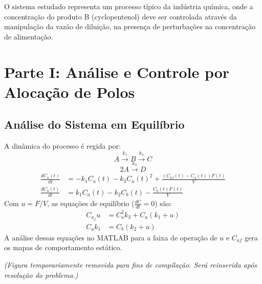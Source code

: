 \documentclass[a4paper,12pt]{report}
\begin{document}
O sistema estudado representa um processo típico da indústria química, onde a concentração do produto B (cyclopentenol) deve ser controlada através da manipulação da vazão de diluição, na presença de perturbações na concentração de alimentação.

\chapter{Parte I: Análise e Controle por Alocação de Polos}
\section{Análise do Sistema em Equilíbrio}
A dinâmica do processo é regida por:
\[ A \xrightarrow{k_1} B \xrightarrow{k_2} C \]
\[ 2A \xrightarrow{k_3} D\]
\begin{align}
\frac{dC_a(t)}{dt} &= -k_1 C_a(t) - k_3 C_a(t)^2 + \frac{(C_{af}(t) - C_a(t)) F(t)}{V} \\
\frac{dC_b(t)}{dt} &= k_1 C_a(t) - k_2 C_b(t) - \frac{C_b(t) F(t)}{V}
\end{align}
Com \(u = F/V\), as equações de equilíbrio (\(\frac{dC}{dt} = 0\)) são:
\begin{align}
C_{a_f} u &= C_a^2 k_3 + C_a (k_1 + u) \\
C_a k_1 &= C_b(k_2 + u)
\end{align}
A análise dessas equações no MATLAB para a faixa de operação de \(u\) e \(C_{af}\) gera os mapas de comportamento estático.

\textit{(Figura temporariamente removida para fins de compilação. Será reinserida após resolução do problema.)}
\end{document}
